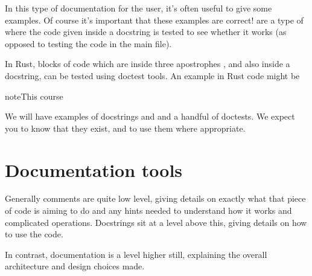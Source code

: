 \documentclass[letterpaper,10pt,british]{sphinxmanual}
\begin{document}
\sphinxAtStartPar
In this type of documentation for the user, it’s often useful to give some examples. Of course it’s important that these examples are correct!  are a type of {\hyperref[\detokenize{chapters/software_development_tools/automated_testing:unit-testing}]{}} where the code given inside a docstring is tested to see whether it works (as opposed to testing the code in the main file).

\sphinxAtStartPar
In Rust, blocks of code which are inside three apostrophes , and also inside a docstring, can be tested using doctest tools. An example in Rust code might be

\begin{sphinxVerbatim}[commandchars=\\\{\}]
\end{sphinxVerbatim}

\begin{sphinxadmonition}{note}{This course}

\sphinxAtStartPar
We will have examples of docstrings and and a handful of doctests. We expect you to know that they exist, and to use them where appropriate.
\end{sphinxadmonition}

\sphinxstepscope


\section{Documentation tools}
\label{\detokenize{chapters/software_development_tools/documentation_tools:documentation-tools}}\label{\detokenize{chapters/software_development_tools/documentation_tools:id1}}\label{\detokenize{chapters/software_development_tools/documentation_tools::doc}}
\sphinxAtStartPar
Generally comments are quite low level, giving details on exactly what that piece of code is aiming to do and any hints needed to understand how it works and complicated operations. Docstrings sit at a level above this, giving details on how to use the code.

\sphinxAtStartPar
In contrast, documentation is a level higher still, explaining the overall architecture and design choices made.
\end{document}

